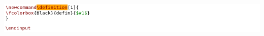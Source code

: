 \noindent \includegraphics[scale=0.5]{Figures/appendix/zmathf.png}


%



%
%
%
%
%
%
%
%
%
%
%
%
%
%
%
%
%
%
%
%
